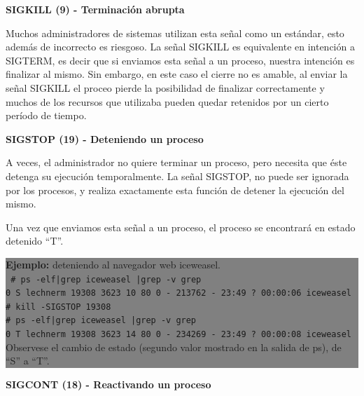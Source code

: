 \documentclass[12pt]{article}
\begin{document}
\textbf{SIGKILL (9) - Terminación abrupta}

Muchos administradores de sistemas utilizan esta señal como un estándar, 
esto además de incorrecto es riesgoso. La señal SIGKILL es equivalente en 
intención a SIGTERM, es decir que si enviamos esta señal a un proceso, 
nuestra intención es finalizar al mismo. Sin embargo, en este caso el
cierre no es amable, al enviar la señal SIGKILL el proceo pierde la 
posibilidad de finalizar correctamente y muchos de los recursos que 
utilizaba pueden quedar retenidos por un cierto período de tiempo.  




\textbf{SIGSTOP (19) - Deteniendo un proceso}

A veces, el administrador no quiere terminar un proceso, pero necesita
que éste detenga su ejecución temporalmente. La señal SIGSTOP, no puede
ser ignorada por los procesos, y realiza exactamente esta función de 
detener la ejecución del mismo. 

Una vez que enviamos esta señal a un proceso, el proceso se encontrará en 
estado detenido ``T''.


\colorbox{grey}{\parbox[t]{0.95\linewidth}{ \vspace*{0.5cm} { 
{\bf Ejemplo:} deteniendo al navegador web iceweasel. \\
{\tt
\# ps -elf|grep iceweasel |grep -v grep \\
0 S lechnerm 19308  3623 10  80   0 - 213762 -     23:49 ?    00:00:06 iceweasel \\

\# kill -SIGSTOP 19308 \\

\# ps -elf|grep iceweasel |grep -v grep \\
0 T lechnerm 19308  3623 14  80   0 - 234269 -     23:49 ?    00:00:08 iceweasel \\
}
Observese el cambio de estado (segundo valor mostrado en la salida de ps), 
de ``S'' a ``T''. 
} \vspace*{0.5cm} } } 


\textbf{SIGCONT (18) - Reactivando un proceso}
\end{document}
